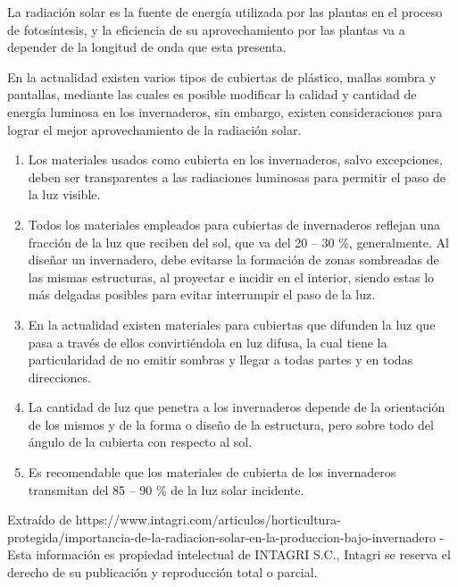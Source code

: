 La radiación solar es la fuente de
energía utilizada por las plantas en el proceso de fotosíntesis, y la
eficiencia de su aprovechamiento por las plantas va a depender de la longitud
de onda que esta presenta.


En la actualidad existen varios tipos de cubiertas de plástico, mallas sombra y
pantallas, mediante las cuales es posible modificar la calidad y cantidad de
energía luminosa en los invernaderos, sin embargo, existen consideraciones para
lograr el mejor aprovechamiento de la radiación solar. 

\begin{enumerate}
    \item Los materiales usados como cubierta en los invernaderos, salvo
        excepciones, deben ser transparentes a las radiaciones luminosas para
        permitir el paso de la luz visible. 

    \item Todos los materiales empleados para cubiertas de invernaderos
        reflejan una fracción de la luz que reciben del sol, que va del 20 – 30
        \%, generalmente. Al diseñar un invernadero, debe evitarse la formación
        de zonas sombreadas de las mismas estructuras, al proyectar e incidir
        en el interior, siendo estas lo más delgadas posibles para evitar
        interrumpir el paso de la luz. 

    \item En la actualidad existen materiales para cubiertas que difunden la
        luz que pasa a través de ellos convirtiéndola en luz difusa, la cual
        tiene la particularidad de no emitir sombras y llegar a todas partes y
        en todas direcciones. 

    \item La cantidad de luz que penetra a los invernaderos depende de la
        orientación de los mismos y de la forma o diseño de la estructura, pero
        sobre todo del ángulo de la cubierta con respecto al sol. 

    \item Es recomendable que los materiales de cubierta de los invernaderos
        transmitan del 85 – 90 \% de la luz solar incidente.
\end{enumerate}

Extraído de
https://www.intagri.com/articulos/horticultura-protegida/importancia-de-la-radiacion-solar-en-la-produccion-bajo-invernadero
- Esta información es propiedad intelectual de INTAGRI S.C., Intagri se reserva
el derecho de su publicación y reproducción total o parcial.

